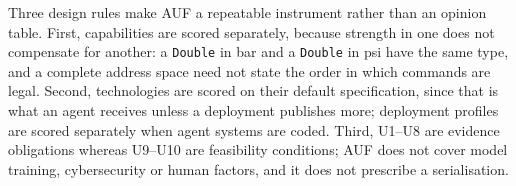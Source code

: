 Three design rules make AUF a repeatable instrument rather than an opinion table. First,
capabilities are scored separately, because strength in one does not compensate for
another: a \texttt{Double} in bar and a \texttt{Double} in psi have the same type, and a
complete address space need not state the order in which commands are legal. Second,
technologies are scored on their default specification, since that is what an agent
receives unless a deployment publishes more; deployment profiles are scored separately
when agent systems are coded. Third, U1--U8 are evidence obligations whereas U9--U10 are
feasibility conditions; AUF does not cover model training, cybersecurity or human
factors, and it does not prescribe a serialisation.
